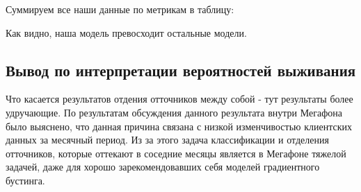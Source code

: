 \documentclass[a4paper,14pt,oneside,openany]{memoir}
\begin{document}
Суммируем все наши данные по метрикам в таблицу:

\begin{table}[H]
	\centering
\end{table}

Как видно, наша модель превосходит остальные модели.

\subsection{Вывод по интерпретации вероятностей выживания}

Что касается результатов отдения отточников между собой - тут результаты более удручающие. По результатам обсуждения данного результата внутри Мегафона было выяснено, что данная причина связана с низкой изменчивостью клиентских данных за месячный период. Из за этого задача классификации и отделения отточников, которые оттекают в соседние месяцы является в Мегафоне тяжелой задачей, даже для хорошо зарекомендовавших себя моделей градиентного бустинга. 
\end{document}

